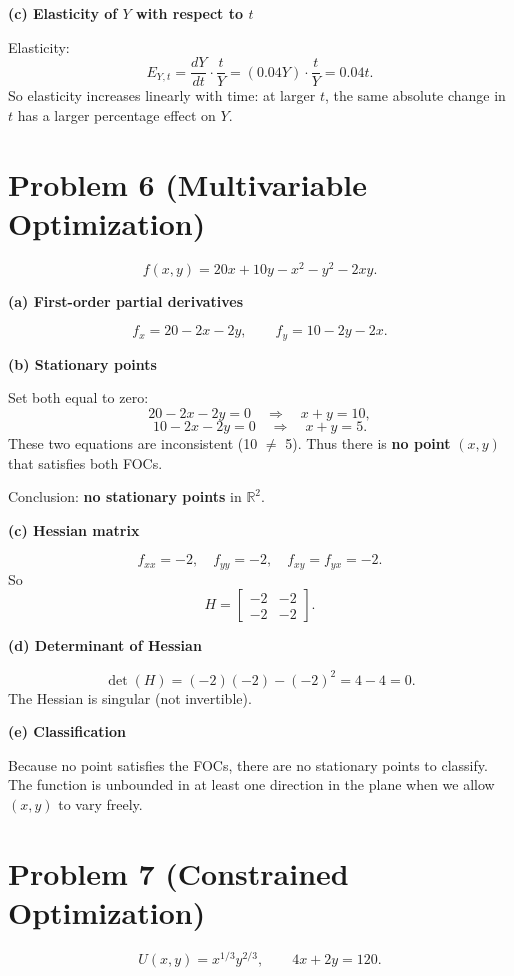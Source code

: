 \documentclass[12pt]{article}
\begin{document}
\textbf{(c) Elasticity of \(Y\) with respect to \(t\)}

Elasticity:
\[
E_{Y,t} = \frac{dY}{dt}\cdot \frac{t}{Y} = (0.04 Y)\cdot \frac{t}{Y} = 0.04 t.
\]
So elasticity increases linearly with time: at larger \(t\), the same absolute change in \(t\) has a larger percentage effect on \(Y\).



\section*{Problem 6 (Multivariable Optimization)}

\[
f(x,y)=20x + 10y - x^2 - y^2 - 2xy.
\]

\textbf{(a) First-order partial derivatives}

\[
f_x = 20 - 2x - 2y,\qquad f_y = 10 - 2y - 2x.
\]

\textbf{(b) Stationary points}

Set both equal to zero:
\[
20 - 2x - 2y = 0 \quad \Rightarrow \quad x + y = 10,
\]
\[
10 - 2x - 2y = 0 \quad \Rightarrow \quad x + y = 5.
\]
These two equations are inconsistent (10 \(\neq\) 5). Thus there is \textbf{no point} \((x,y)\) that satisfies both FOCs.

Conclusion: \textbf{no stationary points} in \(\mathbb{R}^2\).

\textbf{(c) Hessian matrix}

\[
f_{xx} = -2,\quad f_{yy}=-2,\quad f_{xy}=f_{yx}=-2.
\]
So
\[
H = \begin{bmatrix}
-2 & -2\\
-2 & -2
\end{bmatrix}.
\]

\textbf{(d) Determinant of Hessian}

\[
\det(H) = (-2)(-2) - (-2)^2 = 4 - 4 = 0.
\]
The Hessian is singular (not invertible).

\textbf{(e) Classification}

Because no point satisfies the FOCs, there are no stationary points to classify. The function is unbounded in at least one direction in the plane when we allow \((x,y)\) to vary freely.



\section*{Problem 7 (Constrained Optimization)}

\[
U(x,y)=x^{1/3} y^{2/3}, \qquad 4x + 2y = 120.
\]
\end{document}
